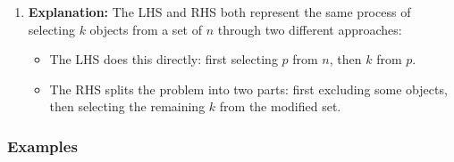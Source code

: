 \begin{example}
\begin{enumerate}
        \item \textbf{Explanation:} The LHS and RHS both represent the same process of selecting $k$ objects from a set of $n$ through two different approaches:
        \begin{itemize}
            \item The LHS does this directly: first selecting $p$ from $n$, then $k$ from $p$.
            \item The RHS splits the problem into two parts: first excluding some objects, then selecting the remaining $k$ from the modified set.
        \end{itemize}
    \end{enumerate}
\end{example}

    \subsubsection{Examples}

